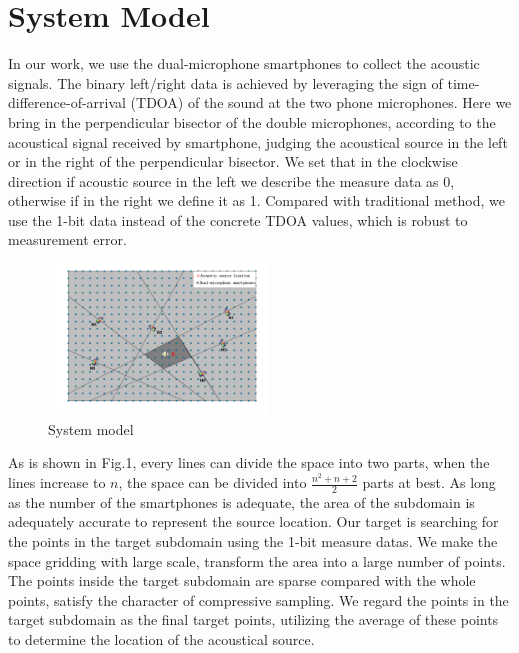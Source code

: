 \section{System Model}


In our work, we use the dual-microphone smartphones to collect the acoustic signals.
The binary left/right data is achieved by leveraging the sign of time-difference-of-arrival (TDOA) of the sound at the two phone microphones. Here we bring in the perpendicular bisector of the double microphones, according to the acoustical signal received by smartphone, judging the acoustical source in the left or in the right of the perpendicular bisector. We set that in the clockwise direction if acoustic source in the left we describe the measure data as 0, otherwise if in the right we define it as 1. Compared with traditional method, we use the 1-bit data instead of the concrete TDOA values, which is robust to measurement error.

  \begin{figure}[!htb]
	\centering
	\setlength{\abovecaptionskip}{-15pt}
	\vspace{-3mm}  
	\includegraphics[width=6cm,height=4.0cm]{image/b.pdf} 
	\vspace{3mm}
	\caption{System model}
	\label{fig2}
	\vspace{-5mm}
\end{figure}

As is shown in Fig.1, every lines can divide the space into two parts, when the lines increase to $n$, the space can be divided into $\frac{n^2+n+2}{2}$ parts at best. As long as the number of the smartphones is adequate,  the area of the subdomain is adequately accurate to represent the source location. 
Our target is searching for the points in the target subdomain using the 1-bit measure datas. We make the space gridding with large scale, transform the area into a large number of points.
The points inside the target subdomain are sparse compared with the whole points, satisfy the character of compressive sampling.
We regard the points in the target subdomain as the final target points, utilizing the average of these points to determine the location of the acoustical source.


